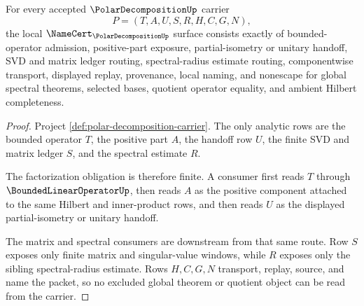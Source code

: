 \begin{theorem}
\label{thm:polar-decomposition-namecert-obligations}
For every accepted $\PolarDecompositionUp$ carrier
$$
P=(T,A,U,S,R,H,C,G,N),
$$
the local $\NameCert_{\PolarDecompositionUp}$ surface consists exactly of bounded-operator admission, positive-part exposure, partial-isometry or unitary handoff, SVD and matrix ledger routing, spectral-radius estimate routing, componentwise transport, displayed replay, provenance, local naming, and nonescape for global spectral theorems, selected bases, quotient operator equality, and ambient Hilbert completeness.
\end{theorem}
\begin{proof}
Project \autoref{def:polar-decomposition-carrier}. The only analytic rows are the bounded operator $T$, the positive part $A$, the handoff row $U$, the finite SVD and matrix ledger $S$, and the spectral estimate $R$.

The factorization obligation is therefore finite. A consumer first reads $T$ through $\BoundedLinearOperatorUp$, then reads $A$ as the positive component attached to the same Hilbert and inner-product rows, and then reads $U$ as the displayed partial-isometry or unitary handoff.

The matrix and spectral consumers are downstream from that same route. Row $S$ exposes only finite matrix and singular-value windows, while $R$ exposes only the sibling spectral-radius estimate. Rows $H,C,G,N$ transport, replay, source, and name the packet, so no excluded global theorem or quotient object can be read from the carrier.
\end{proof}

